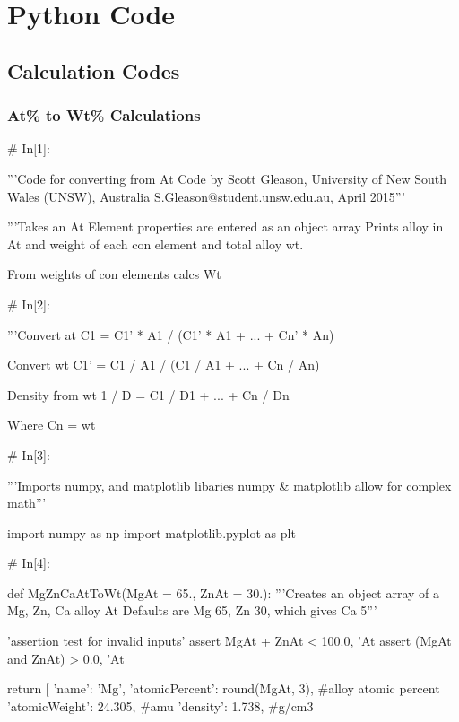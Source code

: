\documentclass[a4paper,8pt]{article}
\begin{document}
\section{Python Code}
\subsection{Calculation Codes}
\subsubsection{At\% to Wt\% Calculations}


\begin{python}
# In[1]:

'''Code for converting from At%
Code by Scott Gleason, University of New South Wales (UNSW), Australia 
S.Gleason@student.unsw.edu.au, April 2015'''

'''Takes an At%
Element properties are entered as an object array
Prints alloy in At%
and weight of each con element and total alloy wt.

From weights of con elements calcs Wt%


# In[2]:

'''Convert at%
C1 = C1' * A1 / (C1' * A1 + ... + Cn' * An)

Convert wt%
C1' = C1 / A1 / (C1 / A1 + ... + Cn / An)

Density from wt%
1 / D = C1 / D1 + ... + Cn / Dn

Where Cn = wt%


# In[3]:

'''Imports numpy, and matplotlib libaries 
numpy & matplotlib allow for complex math'''

import numpy as np
import matplotlib.pyplot as plt


# In[4]:

def MgZnCaAtToWt(MgAt = 65., ZnAt = 30.):
'''Creates an object array of a Mg, Zn, Ca alloy
At%
Defaults are Mg 65, Zn 30, which gives Ca 5'''

'assertion test for invalid inputs'
assert MgAt + ZnAt < 100.0, 'At%
assert (MgAt and ZnAt) > 0.0, 'At%

return [
{'name': 'Mg', 
	'atomicPercent': round(MgAt, 3), #alloy atomic percent
	'atomicWeight': 24.305, #amu
	'density': 1.738}, #g/cm3


\end{python}
\end{document}

